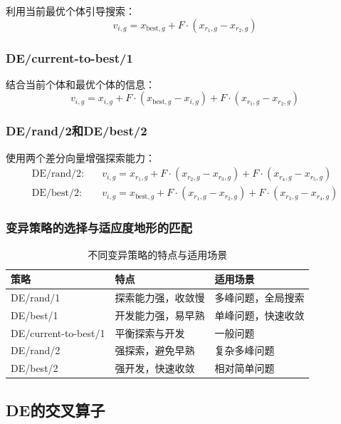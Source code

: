 利用当前最优个体引导搜索：
\[
v_{i,g} = x_{\text{best},g} + F \cdot (x_{r_1,g} - x_{r_2,g})
\]

\subsubsection{DE/current-to-best/1}

结合当前个体和最优个体的信息：
\[
v_{i,g} = x_{i,g} + F \cdot (x_{\text{best},g} - x_{i,g}) + F \cdot (x_{r_1,g} - x_{r_2,g})
\]

\subsubsection{DE/rand/2和DE/best/2}

使用两个差分向量增强探索能力：
\begin{align*}
\text{DE/rand/2}:&\quad v_{i,g} = x_{r_1,g} + F \cdot (x_{r_2,g} - x_{r_3,g}) + F \cdot (x_{r_4,g} - x_{r_5,g}) \\
\text{DE/best/2}:&\quad v_{i,g} = x_{\text{best},g} + F \cdot (x_{r_1,g} - x_{r_2,g}) + F \cdot (x_{r_3,g} - x_{r_4,g})
\end{align*}

\subsubsection{变异策略的选择与适应度地形的匹配}

\begin{table}[H]
\centering
\caption{不同变异策略的特点与适用场景}
\begin{tabular}{p{}p{}p{}}
\toprule
\textbf{策略} & \textbf{特点} & \textbf{适用场景} \\
\midrule
DE/rand/1 & 探索能力强，收敛慢 & 多峰问题，全局搜索 \\
DE/best/1 & 开发能力强，易早熟 & 单峰问题，快速收敛 \\
DE/current-to-best/1 & 平衡探索与开发 & 一般问题 \\
DE/rand/2 & 强探索，避免早熟 & 复杂多峰问题 \\
DE/best/2 & 强开发，快速收敛 & 相对简单问题 \\
\bottomrule
\end{tabular}
\end{table}

\subsection{DE的交叉算子}

